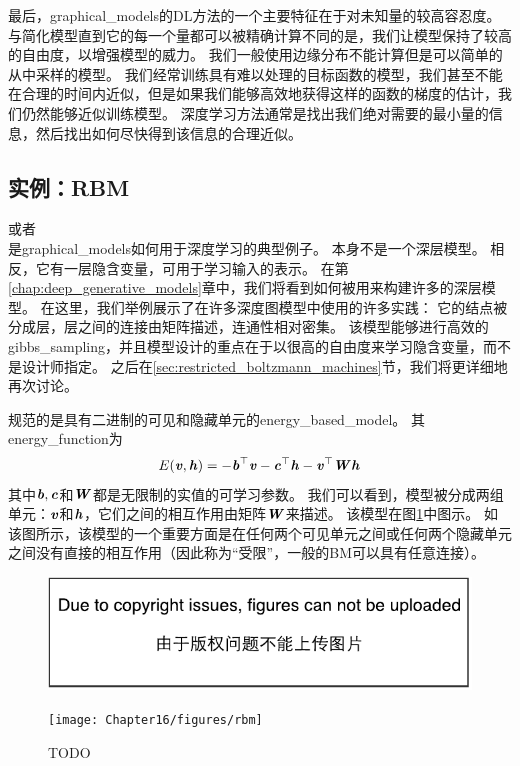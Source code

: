 最后，\gls{graphical_models}的\gls{DL}方法的一个主要特征在于对未知量的较高容忍度。
与简化模型直到它的每一个量都可以被精确计算不同的是，我们让模型保持了较高的自由度，以增强模型的威力。
我们一般使用边缘分布不能计算但是可以简单的从中采样的模型。
我们经常训练具有难以处理的目标函数的模型，我们甚至不能在合理的时间内近似，但是如果我们能够高效地获得这样的函数的梯度的估计，我们仍然能够近似训练模型。
深度学习方法通常是找出我们绝对需要的最小量的信息，然后找出如何尽快得到该信息的合理近似。



\subsection{实例：\gls{RBM}}
\label{sec:example_the_restricted_boltzmann_machine}
\citep{Smolensky86}或者\\ 是\gls{graphical_models}如何用于深度学习的典型例子。 
本身不是一个深层模型。 
相反，它有一层隐含变量，可用于学习输入的表示。 
在第\ref{chap:deep_generative_models}章中，我们将看到如何被用来构建许多的深层模型。
在这里，我们举例展示了在许多深度图模型中使用的许多实践：
它的结点被分成层，层之间的连接由矩阵描述，连通性相对密集。
该模型能够进行高效的\gls{gibbs_sampling}，并且模型设计的重点在于以很高的自由度来学习隐含变量，而不是设计师指定。
之后在\ref{sec:restricted_boltzmann_machines}节，我们将更详细地再次讨论。

规范的是具有二进制的可见和隐藏单元的\gls{energy_based_model}。 其\gls{energy_function}为
\begin{align}
\label{eqn:1610}
E(\boldsymbol{\mathit{v}},\boldsymbol{\mathit{h}}) = -\boldsymbol{\mathit{b}}^{\top}\boldsymbol{\mathit{v}} - \boldsymbol{\mathit{c}}^{\top}\boldsymbol{\mathit{h}} - \boldsymbol{\mathit{v}}^{\top}\boldsymbol{\mathit{W}}\boldsymbol{\mathit{h}}
\end{align}
其中$\boldsymbol{\mathit{b}},\boldsymbol{\mathit{c}}$和$\boldsymbol{\mathit{W}}$都是无限制的实值的可学习参数。
我们可以看到，模型被分成两组单元：$\boldsymbol{\mathit{v}}$和$\boldsymbol{\mathit{h}}$，它们之间的相互作用由矩阵$\boldsymbol{\mathit{W}}$来描述。
该模型在图\ref{fig:rbm}中图示。
如该图所示，该模型的一个重要方面是在任何两个可见单元之间或任何两个隐藏单元之间没有直接的相互作用（因此称为“受限”，一般的\gls{BM}可以具有任意连接）。



\begin{figure}[!htb]
\ifOpenSource
\centerline{\includegraphics{figure.pdf}}
\else
	\centerline{\texttt{[image: Chapter16/figures/rbm]}}	
\fi
	\caption{TODO}
	\label{fig:rbm}
\end{figure}



